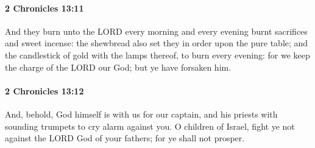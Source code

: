 		\paragraph{2 Chronicles 13:11} %
			\label{2CHRONICLES-13-11}

			And they burn unto the LORD every morning and every evening burnt sacrifices and sweet incense: the shewbread also set they in order upon the pure table; and the candlestick of gold with the lamps thereof, to burn every evening: for we keep the charge of the LORD our God; but ye have forsaken him.


		\paragraph{2 Chronicles 13:12} %
			\label{2CHRONICLES-13-12}

			And, behold, God himself is with us for our captain, and his priests with sounding trumpets to cry alarm against you. O children of Israel, fight ye not against the LORD God of your fathers; for ye shall not prosper.

